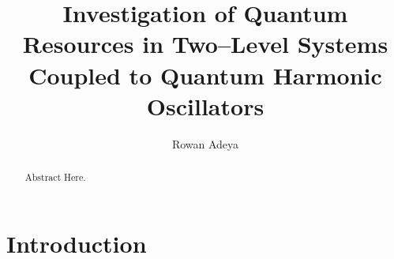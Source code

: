 \documentclass[11pt]{article}
\title{\textbf{Investigation of Quantum Resources in Two--Level Systems Coupled to Quantum Harmonic Oscillators}}
\author{Rowan Adeya}
\date{}
\begin{document}
\maketitle

\newpage

\vspace{\fill}
\begin{abstract}
    Abstract Here.
\end{abstract}
\vspace{\fill}

\newpage
{}
\tableofcontents

\newpage
\section{Introduction}
\end{document}
